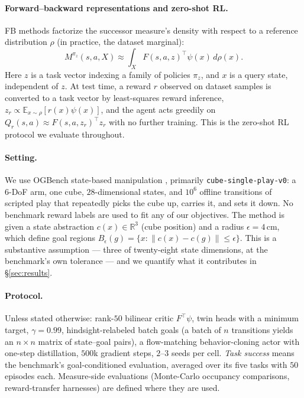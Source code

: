 \documentclass{article}
\newcommand{\E}{\mathbb{E}}
\newcommand{\cube}{c}
\begin{document}
\paragraph{Forward--backward representations and zero-shot RL.}
FB methods \citep{touati2021learning,touati2023does} factorize the successor
measure's density with respect to a reference distribution $\rho$ (in practice,
the dataset marginal):
\begin{equation}
\label{eq:fb}
M^{\pi_z}(s,a,X)
\approx
\int_X F(s,a,z)^{\top}\psi(x)\,d\rho(x).
\end{equation}
Here $z$ is a task vector indexing a family of policies $\pi_z$, and $x$ is a
query state, independent of $z$. At test time, a reward $r$ observed on dataset
samples is converted to a task vector by least-squares reward inference,
$z_r \propto \E_{x\sim\rho}[r(x)\psi(x)]$, and the agent acts greedily on
$Q_r(s,a)\approx F(s,a,z_r)^{\top}z_r$ with no further training. This is the
zero-shot RL protocol we evaluate throughout.

\paragraph{Setting.}
We use OGBench state-based manipulation \citep{park2024ogbench}, primarily
\texttt{cube-single-play-v0}: a $6$-DoF arm, one cube, $28$-dimensional states,
and $10^6$ offline transitions of scripted play that repeatedly picks the cube
up, carries it, and sets it down. No benchmark reward labels are used to fit
any of our objectives. The method is given a state abstraction
$\cube(x)\in\mathbb{R}^3$ (cube position) and a radius $\epsilon=4$\,cm, which
define goal regions
$B_\epsilon(g)=\{x:\|\cube(x)-\cube(g)\|\le\epsilon\}$. This is a substantive
assumption --- three of twenty-eight state dimensions, at the benchmark's own
tolerance --- and we quantify what it contributes in \S\ref{sec:results}.

\paragraph{Protocol.}
Unless stated otherwise: rank-$50$ bilinear critic $F^\top\psi$, twin heads
with a minimum target, $\gamma=0.99$, hindsight-relabeled batch goals (a batch
of $n$ transitions yields an $n\times n$ matrix of state--goal pairs), a
flow-matching behavior-cloning actor with one-step distillation, $500$k
gradient steps, $2$--$3$ seeds per cell. \emph{Task success} means the
benchmark's goal-conditioned evaluation, averaged over its five tasks with $50$
episodes each. Measure-side evaluations (Monte-Carlo occupancy comparisons,
reward-transfer harnesses) are defined where they are used.
\end{document}

